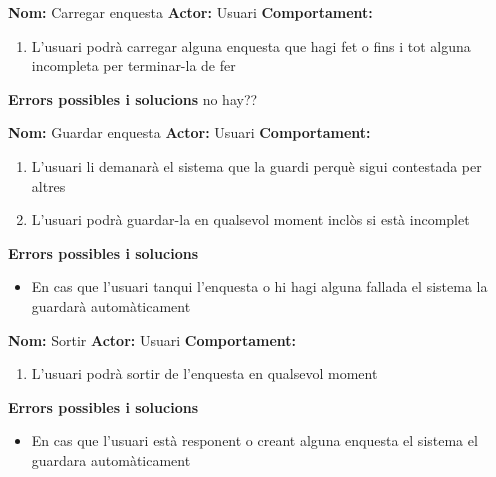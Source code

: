 \documentclass[../main.tex]{subfiles}
\begin{document}
\vspace{0.5 cm}

\textbf{Nom:} Carregar enquesta
\textbf{Actor:} Usuari
\textbf{Comportament:}
\begin{enumerate}
    \item L’usuari podrà carregar alguna enquesta que hagi fet o fins i tot alguna incompleta per terminar-la de fer
\end{enumerate}
\textbf{Errors possibles i solucions}
no hay??

\vspace{0.5 cm}

\textbf{Nom:} Guardar enquesta
\textbf{Actor:} Usuari
\textbf{Comportament:}
\begin{enumerate}
    \item L’usuari li demanarà el sistema que la guardi perquè sigui contestada per altres
    \item L’usuari podrà guardar-la en qualsevol moment inclòs si està incomplet
\end{enumerate}
\textbf{Errors possibles i solucions}
\begin{itemize}
    \item En cas que l’usuari tanqui l’enquesta o hi hagi alguna fallada el sistema la guardarà automàticament
\end{itemize}

\vspace{0.5 cm}

\textbf{Nom:} Sortir
\textbf{Actor:} Usuari
\textbf{Comportament:}
\begin{enumerate}
    \item L’usuari podrà sortir de l’enquesta en qualsevol moment
\end{enumerate}
\textbf{Errors possibles i solucions}
\begin{itemize}
    \item En cas que l’usuari està responent o creant alguna enquesta el sistema el guardara automàticament
\end{itemize}
\end{document}
